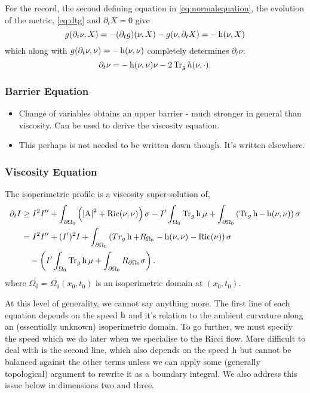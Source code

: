 \documentclass{amsart}
\begin{document}
\begin{rem}
For the record, the second defining equation in \eqref{eq:normalequation}, the evolution of the metric, \eqref{eq:dtg} and \(\partial_t X = 0\) give
\[
g(\partial_t \nu, X) = -(\partial_t g) (\nu, X) - g(\nu, \partial_t X) = -\operatorname{h}(\nu, X)
\]
which along with \(g(\partial_t \nu, \nu) = - \operatorname{h}(\nu, \nu)\) completely determines \(\partial_t \nu\):
\[
\partial_t \nu = -\operatorname{h}(\nu, \nu) \nu - 2\operatorname{Tr}_g h(\nu, \cdot).
\]
\end{rem}

\subsubsection{Barrier Equation}

\begin{itemize}
\item Change of variables obtains an upper barrier - much stronger in general than viscosity. Can be used to derive the viscosity equation.
\item This perhaps is not needed to be written down though. It's written elsewhere.
\end{itemize}

\subsubsection{Viscosity Equation}
\label{subsec:iso_diff_ineq_viscosity}

\begin{thm}
\label{thm:general_viscosity}
The isoperimetric profile is a viscosity super-solution of,
\[
\begin{split}
\partial_t I &\geq I^2 I'' +  \int_{\partial {\Omega_0}} \left(\left|{\operatorname{A}}\right|^2 + \operatorname{Ric}(\nu, \nu)\right) \sigma  - I'\int_{\Omega_0} \operatorname{Tr}_g \operatorname{h} \mu + \int_{\partial {\Omega_0}} \left(\operatorname{Tr}_g \operatorname{h} - \operatorname{h}(\nu, \nu)\right) \sigma \\
&= I^2 I'' +  (I')^2 I + \int_{\partial {\Omega_0}} \left(Tr_g \operatorname{h} + R_{\Omega_0} - \operatorname{h}(\nu, \nu) - \operatorname{Ric}(\nu)\right) \sigma \\
&\quad - \left(I'\int_{\Omega_0} \operatorname{Tr}_g \operatorname{h} \mu + \int_{\partial {\Omega_0}} R_{\partial {\Omega_0}}\sigma \right) .
\end{split}
\]
where \(\Omega_0 = \Omega_0(x_0, t_0)\) is an isoperimetric domain at \((x_0, t_0)\).
\end{thm}

\begin{rem}
At this level of generality, we cannot say anything more. The first line of each equation depends on the speed \(\operatorname{h}\) and it's relation to the ambient curvature along an (essentially unknown) isoperimetric domain. To go further, we must specify the speed which we do later when we specialise to the Ricci flow. More difficult to deal with is the second line, which also depends on the speed \(\operatorname{h}\) but cannot be balanced against the other terms unless we can apply some (generally topological) argument to rewrite it as a boundary integral. We also address this issue below in dimensions two and three.
\end{rem}
\end{document}
